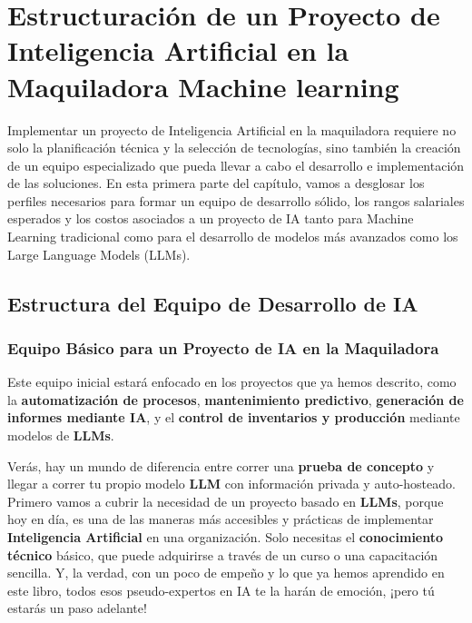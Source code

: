 \documentclass[
  10pt,
  letterpaper,
]{book}
\begin{document}
\section{\texorpdfstring{\textbf{Estructuración de un Proyecto de
Inteligencia Artificial en la Maquiladora } Machine
learning}{Estructuración de un Proyecto de Inteligencia Artificial en la Maquiladora  Machine learning}}\label{estructuraciuxf3n-de-un-proyecto-de-inteligencia-artificial-en-la-maquiladora-machine-learning}

Implementar un proyecto de Inteligencia Artificial en la maquiladora
requiere no solo la planificación técnica y la selección de tecnologías,
sino también la creación de un equipo especializado que pueda llevar a
cabo el desarrollo e implementación de las soluciones. En esta primera
parte del capítulo, vamos a desglosar los perfiles necesarios para
formar un equipo de desarrollo sólido, los rangos salariales esperados y
los costos asociados a un proyecto de IA tanto para Machine Learning
tradicional como para el desarrollo de modelos más avanzados como los
Large Language Models (LLMs).

\subsection{\texorpdfstring{\textbf{Estructura del Equipo de Desarrollo
de
IA}}{Estructura del Equipo de Desarrollo de IA}}\label{estructura-del-equipo-de-desarrollo-de-ia}

\subsubsection{\texorpdfstring{\textbf{Equipo Básico para un Proyecto de
IA en la
Maquiladora}}{Equipo Básico para un Proyecto de IA en la Maquiladora}}\label{equipo-buxe1sico-para-un-proyecto-de-ia-en-la-maquiladora}

Este equipo inicial estará enfocado en los proyectos que ya hemos
descrito, como la \textbf{automatización de procesos},
\textbf{mantenimiento predictivo}, \textbf{generación de informes
mediante IA}, y el \textbf{control de inventarios y producción} mediante
modelos de \textbf{LLMs}.

Verás, hay un mundo de diferencia entre correr una \textbf{prueba de
concepto} y llegar a correr tu propio modelo \textbf{LLM} con
información privada y auto-hosteado. Primero vamos a cubrir la necesidad
de un proyecto basado en \textbf{LLMs}, porque hoy en día, es una de las
maneras más accesibles y prácticas de implementar \textbf{Inteligencia
Artificial} en una organización. Solo necesitas el \textbf{conocimiento
técnico} básico, que puede adquirirse a través de un curso o una
capacitación sencilla. Y, la verdad, con un poco de empeño y lo que ya
hemos aprendido en este libro, todos esos pseudo-expertos en IA te la
harán de emoción, ¡pero tú estarás un paso adelante!
\end{document}
